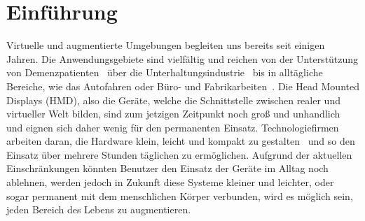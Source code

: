 \chapter{Einführung}

Virtuelle und augmentierte Umgebungen begleiten uns bereits seit einigen Jahren. Die Anwendungsgebiete sind vielfältig und reichen von der Unterstützung von Demenzpatienten~\cite{flynn2003developing, hayhurst2018augmented} über die Unterhaltungsindustrie~\cite{hughes2005mixed} bis in alltägliche Bereiche, wie das Autofahren oder Büro- und Fabrikarbeiten~\cite{medenica2011augmented, caudell1992augmented}. 
Die Head Mounted Displays (HMD), also die Geräte, welche die Schnittstelle zwischen realer und virtueller Welt bilden, sind zum jetzigen Zeitpunkt noch groß und unhandlich und eignen sich daher wenig für den permanenten Einsatz. Technologiefirmen arbeiten daran, die Hardware klein, leicht und kompakt zu gestalten~\cite{shibata2002head, sugihara2012head} und so den Einsatz über mehrere Stunden täglichen zu ermöglichen.
Aufgrund der aktuellen Einschränkungen könnten Benutzer den Einsatz der Geräte im Alltag noch ablehnen, werden jedoch in Zukunft diese Systeme kleiner und leichter, oder sogar permanent mit dem menschlichen Körper verbunden, wird es möglich sein, jeden Bereich des Lebens zu augmentieren. 
